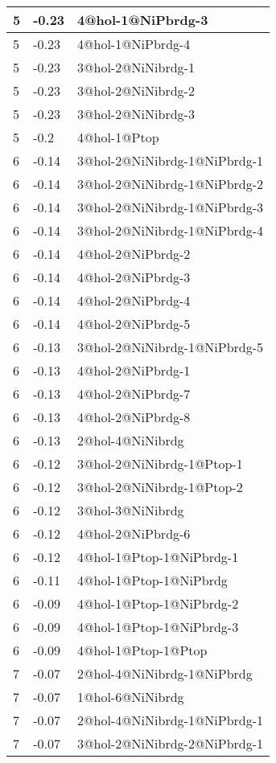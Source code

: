 \begin{center}
\begin{longtable}{|l|l|l|}
5 & -0.23 & 4@hol-1@NiPbrdg-3 \\ \hline
5 & -0.23 & 4@hol-1@NiPbrdg-4 \\ \hline
5 & -0.23 & 3@hol-2@NiNibrdg-1 \\ \hline
5 & -0.23 & 3@hol-2@NiNibrdg-2 \\ \hline
5 & -0.23 & 3@hol-2@NiNibrdg-3 \\ \hline
5 & -0.2 & 4@hol-1@Ptop \\ \hline
6 & -0.14 & 3@hol-2@NiNibrdg-1@NiPbrdg-1 \\ \hline
6 & -0.14 & 3@hol-2@NiNibrdg-1@NiPbrdg-2 \\ \hline
6 & -0.14 & 3@hol-2@NiNibrdg-1@NiPbrdg-3 \\ \hline
6 & -0.14 & 3@hol-2@NiNibrdg-1@NiPbrdg-4 \\ \hline
6 & -0.14 & 4@hol-2@NiPbrdg-2 \\ \hline
6 & -0.14 & 4@hol-2@NiPbrdg-3 \\ \hline
6 & -0.14 & 4@hol-2@NiPbrdg-4 \\ \hline
6 & -0.14 & 4@hol-2@NiPbrdg-5 \\ \hline
6 & -0.13 & 3@hol-2@NiNibrdg-1@NiPbrdg-5 \\ \hline
6 & -0.13 & 4@hol-2@NiPbrdg-1 \\ \hline
6 & -0.13 & 4@hol-2@NiPbrdg-7 \\ \hline
6 & -0.13 & 4@hol-2@NiPbrdg-8 \\ \hline
6 & -0.13 & 2@hol-4@NiNibrdg \\ \hline
6 & -0.12 & 3@hol-2@NiNibrdg-1@Ptop-1 \\ \hline
6 & -0.12 & 3@hol-2@NiNibrdg-1@Ptop-2 \\ \hline
6 & -0.12 & 3@hol-3@NiNibrdg \\ \hline
6 & -0.12 & 4@hol-2@NiPbrdg-6 \\ \hline
6 & -0.12 & 4@hol-1@Ptop-1@NiPbrdg-1 \\ \hline
6 & -0.11 & 4@hol-1@Ptop-1@NiPbrdg \\ \hline
6 & -0.09 & 4@hol-1@Ptop-1@NiPbrdg-2 \\ \hline
6 & -0.09 & 4@hol-1@Ptop-1@NiPbrdg-3 \\ \hline
6 & -0.09 & 4@hol-1@Ptop-1@Ptop \\ \hline
7 & -0.07 & 2@hol-4@NiNibrdg-1@NiPbrdg \\ \hline
7 & -0.07 & 1@hol-6@NiNibrdg \\ \hline
7 & -0.07 & 2@hol-4@NiNibrdg-1@NiPbrdg-1 \\ \hline
7 & -0.07 & 3@hol-2@NiNibrdg-2@NiPbrdg-1 \\ \hline

\end{longtable}
\end{center}

